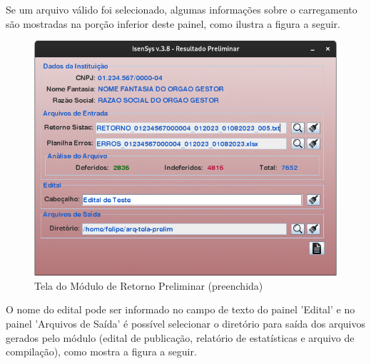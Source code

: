 \documentclass[
	12pt,			%
	openright,		%
	oneside,	
	a4paper,		%
	english,		%
	brazil			%
]{abntex2/abntex2}  %
\begin{document}
					Se um arquivo válido foi selecionado, algumas informações sobre o carregamento são mostradas na porção inferior deste painel, como ilustra a figura a seguir.
		
					\begin{figure}[h]
						\begin{center}
							
							\caption{Tela do Módulo de Retorno Preliminar (preenchida)}
							\label{retorno-prelim-ui-processed}
							
							\includegraphics[scale=0.6]{img/retorno-prelim-ui-processed}
							
						\end{center}
					\end{figure}
		
					O nome do edital pode ser informado no campo de texto do painel 'Edital' e no painel 'Arquivos de Saída' é possível selecionar o diretório para saída dos arquivos gerados pelo módulo (edital de publicação, relatório de estatísticas e arquivo de compilação), como mostra a figura a seguir.
		
\end{document}
